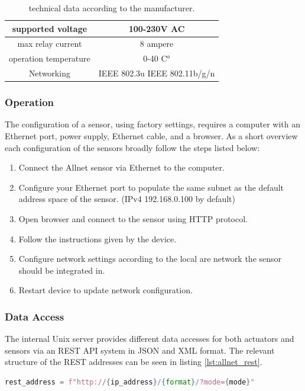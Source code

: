 \begin{table}[b]
    \centering
    \begin{tabular}{cc}
    \hline
        supported voltage & 100-230V AC \\
        \hline
        max relay current & 8 ampere \\
        \hline
        operation temperature & 0-40 C°\\
        \hline
        Networking & IEEE 802.3u IEEE 802.11b/g/n\\
        \hline
    \end{tabular}
    \caption{technical data according to the manufacturer.}
    \label{tab:allnet_data}
\end{table}

\subsubsection{Operation}
The configuration of a sensor, using factory settings, requires a computer with an Ethernet port, power supply, Ethernet cable, and a browser. As a short overview each configuration of the sensors  broadly follow the steps listed below:

\begin{enumerate}
	\item Connect the Allnet sensor via Ethernet to the computer.
	\item Configure your Ethernet port to populate the same subnet as the default address space of the sensor. (IPv4 192.168.0.100 by default) 
	\item Open browser and connect to the sensor using HTTP protocol. 
	\item Follow the instructions given by the device.
	\item Configure network settings according to the local are network the sensor should be integrated in.
	\item Restart device to update network configuration.
\end{enumerate}

\subsubsection{Data Access}
The internal Unix server provides different data accesses for both actuators and sensors via an REST API system in JSON and XML format.
The relevant structure of the REST addresses can be seen in listing \ref{lst:allnet_rest}.

    \begin{lstlisting}[language=python, caption={address format of a sensor, provided variable values of a valid ip\_address (0.0.0.0 to 255.255.255.255) a format (xml or json) and a valid mode (all, sensor, ).},label={lst:allnet_rest}]
rest_address = f"http://{ip_address}/{format}/?mode={mode}"
\end{lstlisting}

